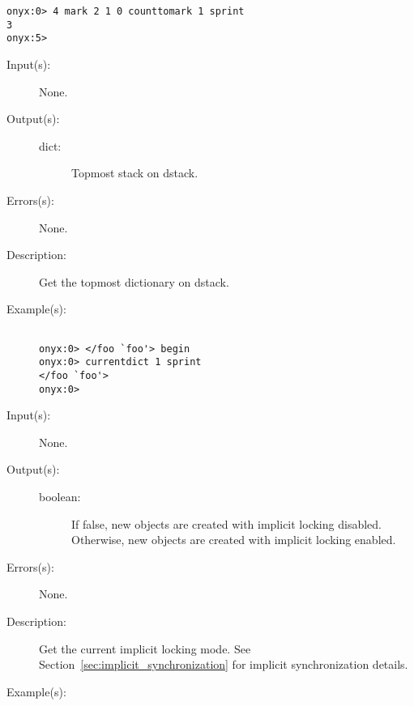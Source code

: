 \begin{description}
\begin{description}
\begin{verbatim}
onyx:0> 4 mark 2 1 0 counttomark 1 sprint
3
onyx:5>
		\end{verbatim}
	\end{description}
\label{systemdict:currentdict}
\item[{\onyxop{--}{currentdict}{dict}}: ]
	\begin{description}\item[]
	\item[Input(s): ] None.
	\item[Output(s): ]
		\begin{description}\item[]
		\item[dict: ]
			Topmost stack on dstack.
		\end{description}
	\item[Errors(s): ] None.
	\item[Description: ]
		Get the topmost dictionary on dstack.
	\item[Example(s): ]\begin{verbatim}

onyx:0> </foo `foo'> begin 
onyx:0> currentdict 1 sprint
</foo `foo'>
onyx:0>
		\end{verbatim}
	\end{description}
\label{systemdict:currentlocking}
\item[{\onyxop{--}{currentlocking}{boolean}}: ]
	\begin{description}\item[]
	\item[Input(s): ] None.
	\item[Output(s): ]
		\begin{description}\item[]
		\item[boolean: ]
			If false, new objects are created with implicit locking
			disabled.  Otherwise, new objects are created with
			implicit locking enabled.
		\end{description}
	\item[Errors(s): ] None.
	\item[Description: ]
		Get the current implicit locking mode.  See
		Section~\ref{sec:implicit_synchronization} for implicit
		synchronization details.
	\item[Example(s): ]\begin{verbatim}


\end{verbatim}
\end{description}
\end{description}
